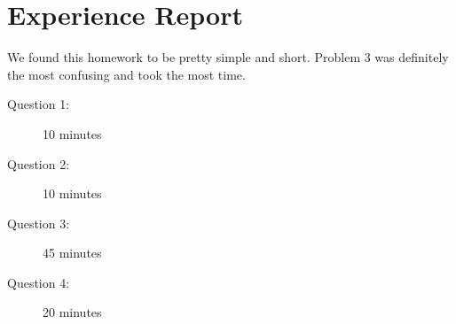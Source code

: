 \documentclass[12pt]{article}
\begin{document}
        \section{Experience Report}
        We found this homework to be pretty simple and short. Problem 3 was definitely the most confusing and took the most time. 
        \begin{description}
            \item[Question 1:] 10 minutes
            \item[Question 2:] 10 minutes
            \item[Question 3:] 45 minutes
            \item[Question 4:] 20 minutes
        \end{description}        
\end{document}
